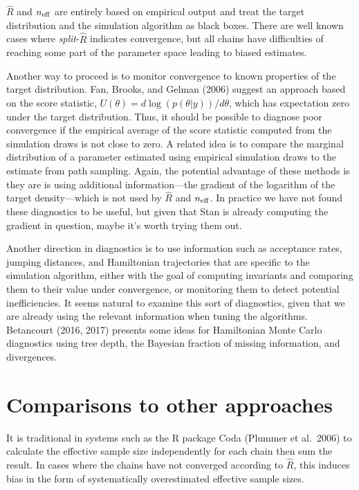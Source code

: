 \documentclass[11pt]{article}
\begin{document}
$\widehat{R}$ and $n_{\rm eff}$ are entirely based on empirical output and treat the target distribution and the simulation algorithm as black boxes. There are well known cases where {\em split}-$\widehat{R}$ indicates convergence, but all chains have difficulties of reaching some part of the parameter space leading to biased estimates.

Another way to proceed is to monitor convergence to known properties of the target distribution.  Fan, Brooks, and Gelman (2006) suggest an approach based on the score statistic, $U(\theta) = d\log(p(\theta|y))/d\theta$, which has expectation zero under the target distribution.  Thus, it should be possible to diagnose poor convergence if the empirical average of the score statistic computed from the simulation draws is not close to zero.  A related idea is to compare the marginal distribution of a parameter estimated using empirical simulation draws to the estimate from path sampling.  Again, the potential advantage of these methods is they are is using additional information---the gradient of the logarithm of the target density---which is not used by $\widehat{R}$ and $n_{\rm eff}$.  In practice we have not found these diagnostics to be useful, but given that Stan is already computing the gradient in question, maybe it's worth trying them out.

Another direction in diagnostics is to use information such as acceptance rates, jumping distances, and Hamiltonian trajectories that are specific to the simulation algorithm, either with the goal of computing invariants and comparing them to their value under convergence, or monitoring them to detect potential inefficiencies.  It seems natural to examine this sort of diagnostics, given that we are already using the relevant information when tuning the algorithms.  Betancourt (2016, 2017) presents some ideas for Hamiltonian Monte Carlo diagnostics using tree depth, the Bayesian fraction of missing information, and divergences.

\section{Comparisons to other approaches}

It is traditional in systems such as the R package Coda (Plummer et al.~2006) to calculate the effective sample size independently for each chain then sum the result.  In cases where the chains have not converged according to $\widehat{R}$, this induces bias in the form of systematically overestimated effective sample sizes.
\end{document}
